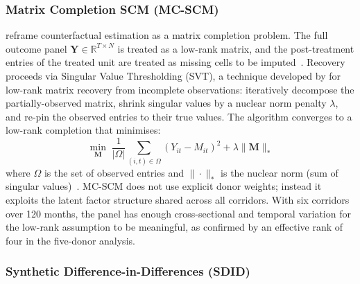 \subsubsection{Matrix Completion SCM (MC-SCM)}
\label{sec:mcscm}

\textcite{athey2021} reframe counterfactual estimation as
a matrix completion problem.
The full outcome panel $\mathbf{Y} \in \mathbb{R}^{T \times N}$ is
treated as a low-rank matrix, and the post-treatment entries of the
treated unit are treated as missing cells to be imputed~\parencite{athey2021}.
Recovery proceeds via Singular Value Thresholding (SVT), a technique
developed by \textcite{cai2010svt} for low-rank matrix recovery from
incomplete observations:
iteratively decompose the partially-observed matrix, shrink singular
values by a nuclear norm penalty $\lambda$, and re-pin the observed
entries to their true values.
The algorithm converges to a low-rank completion that minimises:
\begin{equation}
  \min_{\mathbf{M}} \;
  \frac{1}{|\Omega|}\sum_{(i,t)\in\Omega}(Y_{it} - M_{it})^2
  + \lambda \|\mathbf{M}\|_*
  \label{eq:mcscm}
\end{equation}
where $\Omega$ is the set of observed entries and $\|\cdot\|_*$
is the nuclear norm (sum of singular values)~\parencite{athey2021}.
MC-SCM does not use explicit donor weights; instead it exploits the
latent factor structure shared across all corridors.
With six corridors over 120 months, the panel has enough
cross-sectional and temporal variation for the low-rank assumption
to be meaningful, as confirmed by an effective rank of four in the
five-donor analysis.

\subsubsection{Synthetic Difference-in-Differences (SDID)}
\label{sec:sdid}

